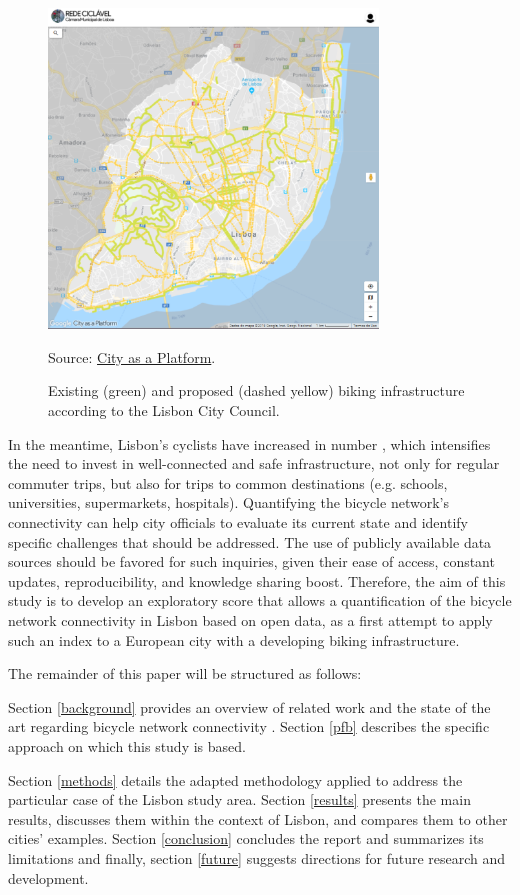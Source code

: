 \documentclass[information,article,submit,moreauthors,Latex,dvi2pdf,10pt,a4paper]{Definitions/mdpi}
\begin{document}
\begin{figure}[ht]
	\begin{center}
		\includegraphics[height=8.5cm]{fig1}
		\caption{Existing (green) and proposed (dashed yellow) biking infrastructure according to the Lisbon City Council.} Source: \protect\href{https://lisboa.city-platform.com/app/?a=redeciclavel}{City as a Platform}.
		\label{fig1}
	\end{center}
\end{figure}

In the meantime, Lisbon's cyclists have increased in number \cite{Baratto2016}, which intensifies the need to invest in well-connected and safe infrastructure, not only for regular commuter trips, but also for trips to common destinations (e.g. schools, universities, supermarkets, hospitals). Quantifying the bicycle network's connectivity can help city officials to evaluate its current state and identify specific challenges that should be addressed. The use of publicly available data sources should be favored for such inquiries, given their ease of access, constant updates, reproducibility, and knowledge sharing boost\lucas[?] \cite{opendatahandbook,EuropeanDataPortal2018}. Therefore, the aim of this study is to develop an exploratory score that allows a quantification of the bicycle network connectivity in Lisbon based on open data, as a first attempt to apply such an index to a European city with a developing biking infrastructure.

The remainder of this paper will be structured as follows:
\begin{mycolorbox}[colback=yellow]
Section \ref{background} provides an overview of related work and the state of the art regarding bicycle network connectivity . Section \ref{pfb} describes the specific approach on which this study is based.
\end{mycolorbox}
Section \ref{methods} details the adapted methodology applied to address the particular case of the Lisbon study area. Section \ref{results} presents the main results, discusses them within the context of Lisbon, and compares them to other cities' examples. Section \ref{conclusion} concludes the report and summarizes its limitations and finally, section \ref{future} suggests directions for future research and development.
\end{document}
